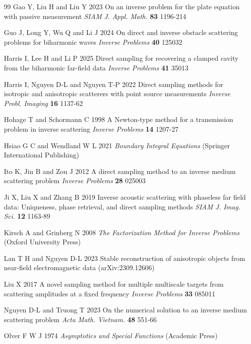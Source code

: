 \documentclass[10pt,a4paper]{article}
\numberwithin{equation}{section}
\begin{document}
\begin{thebibliography}{99}
    Gao Y, Liu H and Liu Y 2023 On an inverse problem for the plate equation with passive measurement \emph{SIAM J. Appl. Math.} {\bf 83} 1196-214
  
  Guo J, Long Y, Wu Q and Li J 2024 On direct and inverse obstacle scattering problems for biharmonic waves \emph{Inverse Problems} {\bf 40} 125032
  
  Harris I, Lee H and Li P 2025 Direct sampling for recovering a clamped cavity from the biharmonic far-field data \emph{Inverse Problems} {\bf 41} 35013

   Harris I, Nguyen D-L and Nguyen T-P 2022 Direct sampling methods for isotropic and anisotropic scatterers with point source measurements \emph{Inverse Probl. Imaging} {\bf 16} 1137-62

  Hohage T and Schormann C 1998 A Newton-type method for a transmission problem in inverse scattering \emph{Inverse Problems} {\bf 14} 1207-27

  Hsiao G C and Wendland W L 2021 \emph{Boundary Integral Equations}  (Springer International Publishing)

  Ito K, Jin B and Zou J 2012 A direct sampling method to an inverse medium scattering problem \emph{Inverse Problems} {\bf 28} 025003

  
    Ji X, Liu X and Zhang B 2019 Inverse acoustic scattering with phaseless far field data: Uniqueness, phase retrieval, and direct sampling methods \emph{SIAM J. Imag. Sci.}  {\bf 12} 1163-89

    Kirsch A and Grinberg N 2008 \emph{The Factorization Method for Inverse Problems} (Oxford University Press)

    Lan T H and Nguyen D-L 2023 Stable reconstruction of anisotropic objects from near-field electromagnetic data (arXiv:2309.12606)

    Liu X 2017 A novel sampling method for multiple multiscale targets from scattering amplitudes at a fixed frequency \emph{Inverse Problems} {\bf 33} 085011

 Nguyen D-L and Truong T 2023 On the numerical solution to an inverse medium scattering problem \emph{Acta Math. Vietnam.} {\bf 48} 551-66

    Olver F W J 1974 \emph{Asymptotics and Special Functions} (Academic Press)
  

\end{thebibliography}
\end{document}
